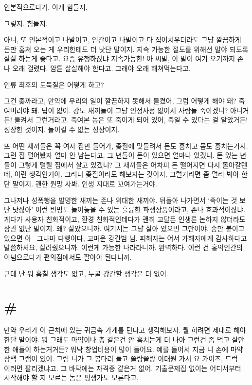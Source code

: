 \documentclass[a5paper,10pt, twoside, openright]{memoir}
\begin{document}
	인본적으로다가. 이게 힘들지. 
	
	그렇지. 힘들지. 
	
	아니, 또 인본적이고 나발이고, 인간이고 나발이고 다 집어치우더라도 그냥 깔끔하게 돈만 훔쳐 오는 게 우리한테도 더 낫단 말이지. 지속 가능한 절도를 위해선 말야 되도록 살살 하는게 좋다고. 요즘 유행하잖냐 지속가능한! 아 씨발, 이 말이 여기 오기까지 존나 오래 걸렸다. 암튼 살살해야 한다고. 그래야 오래 해쳐먹는다고. 
	
	인류 최후의 도둑질은 어떻게 하고? 

	그건 좆까라고, 만약에 우리의 일이 깔끔하지 못해서 들켰어, 그럼 어떻게 해야 돼? 죽여버려야 돼. 답이 없어. 강도 새끼들이 그냥 인정사정 없어서 사람들 죽이겠니? 아니거든! 들켜서 그런거라고. 죽여본 놈은 또 죽이게 되어 있어, 죽일 수 있다는 걸 알았거든! 성장한 것이지. 돌이킬 수 없는 성장이지.

	또 어떤 새끼들은 꼭 여자 집만 들어가, 좆질에 맛들려서 돈도 훔치고 몸도 훔치는거지. 그런 집 털어봤자 얼마 안 남는다고. 그 년들이 돈이 있으면 얼마나 있겠니. 돈 있는 년들이 그렇게 털릴 집에서 살고 있겠니? 그 새끼들은 어차피 돈 떨어지면 다시 돌아갈텐데, 이런 생각인거야. 그러니 좆질이라도 해보자는 것이지. 그럴거라면 좀 멀리 봐야 한단 말이지. 괜한 원망 사봐. 인생 지대로 꼬여가는거야. 

	그나저나 성폭행을 발명한 새끼는 존나 위대한 새끼야. 뒤돌아 나가면서 ‘죽이는 것 보단 낫잖아’ 이런 변명도 늘어놓을 수 있는 훌륭한 파생상품이라고, 존나 효과적이잖냐. 게다가 사용자 친화적이고, 환경 친화적인데다가 괜히 고달픈 인생론 논하지 않더라도 상관 없단 말이지. 왜? 살았으니까. 여기서는 그냥 살아 있으면 그만이야. 숨만 붙이고 있으면 아~ 그나마 다행이다, 고마운 강간범 님. 피해자는 어서 가해자에게 감사하다고 말씀하셔요, 살려줬으니까. 이런게 가능한 나라라니까. 완벽하다. 이런 건 홍익인간의 이념으로다가 편의점에서도 팔아야 된다니까. 

	근데 난 뭐 훔칠 생각도 없고, 누굴 강간할 생각은 더 없어. 

	\section{\#}
	만약 우리가 이 근처에 있는 귀금속 가게를 턴다고 생각해보자. 뭘 하려면 제대로 해야 한단 말이야. 뭐 그래도 마약이나 총 같은건 안 훔치는게 더 나아 그런건 좀 먹고 살만한 애들이 하는거거든? 워낙 창업비용이 많이 들어요. 예를 들어서 지금 니 손에 마약 삼백 그램이 있어. 그럼 니가 그 봉다리 들고 쫄랑쫄랑 이태원 가서 요 가이즈, 드럭~ 이러면 팔리겠냐고. 그 바닥에는 자격증 같은거 없어. 기출문제집 없이는 어디서부터 시작해야 할 지 모르는 놈은 평생가도 모른다고.
\end{document}
